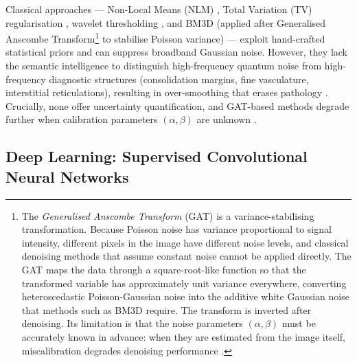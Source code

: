 \documentclass[12pt, a4paper, twoside, openright]{book}
\begin{document}
Classical approaches — Non-Local Means (NLM) \cite{buades_non-local_2005}, Total Variation (TV) regularisation \cite{rudin_nonlinear_1992}, wavelet thresholding \cite{donoho_ideal_1994}, and BM3D \cite{dabov_image_2007} (applied after Generalised Anscombe Transform\footnote{The \emph{Generalised Anscombe Transform} (GAT) \cite{makitalo_optimal_2013} is a variance-stabilising transformation. Because Poisson noise has variance proportional to signal intensity, different pixels in the image have different noise levels, and classical denoising methods that assume constant noise cannot be applied directly. The GAT maps the data through a square-root-like function so that the transformed variable has approximately unit variance everywhere, converting heteroscedastic Poisson-Gaussian noise into the additive white Gaussian noise that methods such as BM3D require. The transform is inverted after denoising. Its limitation is that the noise parameters $(\alpha, \beta)$ must be accurately known in advance: when they are estimated from the image itself, miscalibration degrades denoising performance \cite{borges_noise_2020}.} to stabilise Poisson variance) — exploit hand-crafted statistical priors and can suppress broadband Gaussian noise. However, they lack the semantic intelligence to distinguish high-frequency quantum noise from high-frequency diagnostic structures (consolidation margins, fine vasculature, interstitial reticulations), resulting in over-smoothing that erases pathology \cite{rudin_nonlinear_1992}. Crucially, none offer uncertainty quantification, and GAT-based methods degrade further when calibration parameters $(\alpha,\beta)$ are unknown \cite{borges_noise_2020}.

\subsection{Deep Learning: Supervised Convolutional Neural Networks}
\label{sec:intro:existing:cnn}
\end{document}
